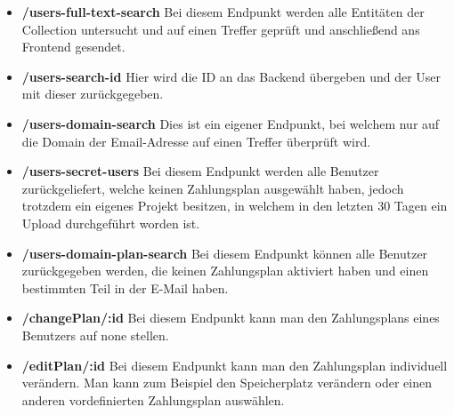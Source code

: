 \begin{itemize}
    \item \textbf{/users-full-text-search}
        \newline
        Bei diesem Endpunkt werden alle Entitäten der Collection untersucht und auf einen Treffer geprüft und anschließend ans Frontend gesendet.
    \item \textbf{/users-search-id}
        \newline
        Hier wird die ID an das Backend übergeben und der User mit dieser zurückgegeben.
    \item \textbf{/users-domain-search}
        \newline
        Dies ist ein eigener Endpunkt, bei welchem nur auf die Domain der Email-Adresse auf einen Treffer überprüft wird.
    \item \textbf{/users-secret-users}
        \newline
        Bei diesem Endpunkt werden alle Benutzer zurückgeliefert, welche keinen Zahlungsplan ausgewählt haben, jedoch trotzdem ein eigenes Projekt besitzen, in welchem in den letzten 30 Tagen ein Upload durchgeführt worden ist.
    \item \textbf{/users-domain-plan-search}
        \newline
        Bei diesem Endpunkt können alle Benutzer zurückgegeben werden, die keinen Zahlungsplan aktiviert haben und einen bestimmten Teil in der E-Mail haben.
    \item \textbf{/changePlan/:id}
        \newline
        Bei diesem Endpunkt kann man den Zahlungsplans eines Benutzers auf none stellen.
    \item \textbf{/editPlan/:id}
        \newline
        Bei diesem Endpunkt kann man den Zahlungsplan individuell verändern. Man kann zum Beispiel den Speicherplatz verändern oder einen anderen vordefinierten Zahlungsplan auswählen.
\end{itemize}